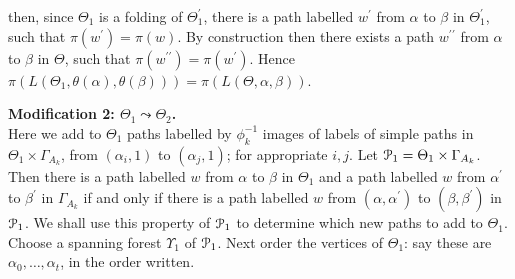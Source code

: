 \documentclass[a4paper,12pt]{article}
\renewcommand{\a}{\alpha }
\renewcommand{\b}{\beta }
\newcommand{\G}{\Gamma }
\newcommand{\T}{\Theta }
\newcommand{\U}{\Upsilon }
\newcommand{\cP}{{\cal{P}}}
\numberwithin{equation}{section}
\numberwithin{figure}{section}
\begin{document}
then, since $\Theta_1$ is a folding of $\Theta_1^\prime$,
 there is a path labelled $w^\prime$ from $\a$ to $\b$ in $\Theta_1^\prime$,
such that $\pi(w^\prime)=\pi(w)$.
By construction then there exists  a path $w^{\prime\prime}$ from
$\a$ to $\b$ in $\Theta$, such that $\pi(w^{\prime\prime}) =
\pi(w^\prime)$. Hence $\pi(L(\Theta_1,\theta(\a),\theta(\b)))
= \pi(L(\Theta, \a,\b))$.  \\[1em]

\noindent\textbf{Modification 2: $\T_1\leadsto \T_2$.}\\
Here we add to $\T_1$ paths labelled by $\phi_k^{-1}$ images of labels of simple
paths in $\T_1\times \G_{A_k}$, from $(\a_i,1)$ to $(\a_j,1)$; for
appropriate $i,j$.
 Let $\cP_1=\T_1\times \G_{A_k}$. Then there is a path
 labelled $w$ from $\a$ to $\b$
in $\T_1$ and a path labelled $w$ from $\a^\prime $
to $\b^\prime$ in $\G_{A_k}$ if and only if there is a path
labelled $w$ from $(\a,\a^\prime)$ to $(\b,\b^\prime)$ in $\cP_1$.
 We shall
use this property of $\cP_1$ to determine which new paths to add  to
$\T_1$. Choose a spanning  forest $\U_1$ of  $\cP_1$. Next
 order the vertices of
$\T_1$: say these are $\a_0,\ldots, \a_t$, in the order written.
\end{document}
